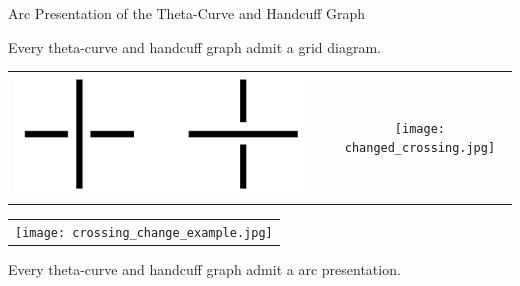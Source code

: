 \begin{frame}{Arc Presentation of the Theta-Curve and Handcuff Graph}
	\begin{thm}
    Every theta-curve and handcuff graph admit a grid diagram.
    \end{thm}
	\mypf
    \begin{center}
    \begin{tabu}{c c c}
        \includegraphics[width=0.2\linewidth]{figure/crossings.png} &
        \raisebox{0.5cm}{$\xmapsto{}$} &
        \texttt{[image: changed\_crossing.jpg]}
    \end{tabu}
    \begin{tabu}{c}
        \texttt{[image: crossing\_change\_example.jpg]}
    \end{tabu}
    \end{center}
    \begin{corollary}
    Every theta-curve and handcuff graph admit a arc presentation.
    \end{corollary}
\end{frame}
